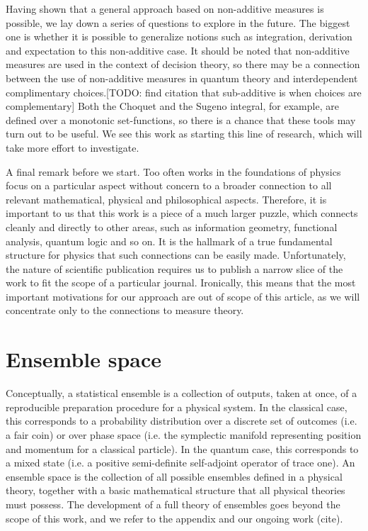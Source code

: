 \documentclass[10pt,twocolumn, nofootinbib]{revtex4-2}
\begin{document}
Having shown that a general approach based on non-additive measures is possible, we lay down a series of questions to explore in the future. The biggest one is whether it is possible to generalize notions such as integration, derivation and expectation to this non-additive case.  It should be noted that non-additive measures are used in the context of decision theory, so there may be a connection between the use of non-additive measures in quantum theory and interdependent complimentary choices.[TODO: find citation that sub-additive is when choices are complementary] Both the Choquet and the Sugeno integral, for example, are defined over a monotonic set-functions, so there is a chance that these tools may turn out to be useful. We see this work as starting this line of research, which will take more effort to investigate.

A final remark before we start. Too often works in the foundations of physics focus on a particular aspect without concern to a broader connection to all relevant mathematical, physical and philosophical aspects. Therefore, it is important to us that this work is a piece of a much larger puzzle, which connects cleanly and directly to  other areas, such as information geometry, functional analysis, quantum logic and so on. It is the hallmark of a true fundamental structure for physics that such connections can be easily made. Unfortunately, the nature of scientific publication requires us to publish a narrow slice of the work to fit the scope of a particular journal. Ironically, this means that the most important motivations for our approach are out of scope of this article, as we will concentrate only to the connections to measure theory.

\section{Ensemble space}

Conceptually, a statistical ensemble is a collection of outputs, taken at once, of a reproducible preparation procedure for a physical system. In the classical case, this corresponds to a probability distribution over a discrete set of outcomes (i.e. a fair coin) or over phase space (i.e. the symplectic manifold representing position and momentum for a classical particle). In the quantum case, this corresponds to a mixed state (i.e. a positive semi-definite self-adjoint operator of trace one). An ensemble space is the collection of all possible ensembles defined in a physical theory, together with a basic mathematical structure that all physical theories must possess. The development of a full theory of ensembles goes beyond the scope of this work, and we refer to the appendix and our ongoing work (cite).
\end{document}
